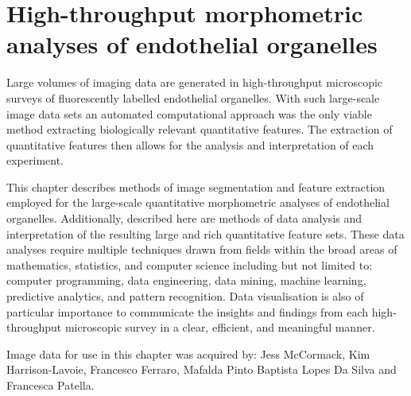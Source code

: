 \chapter{High-throughput morphometric analyses of endothelial organelles}
\label{endothelial_morphometry}
\ifpdf
	\graphicspath{{chapter_2/figs/}}
\fi


Large volumes of imaging data are generated in high-throughput microscopic surveys of fluorescently labelled endothelial organelles. With such large-scale image data sets an automated computational approach was the only viable method extracting biologically relevant quantitative features. The extraction of quantitative features then allows for the analysis and interpretation of each experiment.

This chapter describes methods of image segmentation and feature extraction employed for the large-scale quantitative morphometric analyses of endothelial organelles. Additionally, described here are methods of data analysis and interpretation of the resulting large and rich quantitative feature sets. These data analyses require multiple techniques drawn from fields within the broad areas of mathematics, statistics, and computer science including but not limited to: computer programming, data engineering, data mining, machine learning, predictive analytics, and pattern recognition. Data visualisation is also of particular importance to communicate the insights and findings from each high-throughput microscopic survey in a clear, efficient, and meaningful manner.

Image data for use in this chapter was acquired by: Jess McCormack, Kim Harrison-Lavoie, Francesco Ferraro, Mafalda Pinto Baptista Lopes Da Silva and Francesca Patella.

